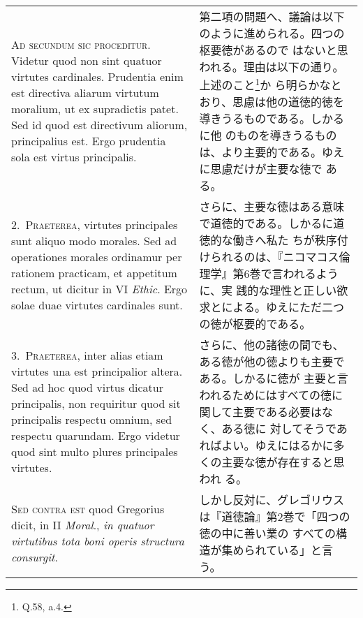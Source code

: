 \documentclass[10pt]{jsarticle}
\begin{document}
\begin{longtable}{p{21em}p{21em}}
{\scshape Ad secundum sic proceditur}. Videtur quod non sint quatuor
virtutes cardinales. Prudentia enim est directiva aliarum virtutum
moralium, ut ex supradictis patet. Sed id quod est directivum aliorum,
principalius est. Ergo prudentia sola est virtus principalis.

&

 第二項の問題へ、議論は以下のように進められる。四つの枢要徳があるので
 はないと思われる。理由は以下の通り。上述のこと\footnote{Q.58, a.4.}か
 ら明らかなとおり、思慮は他の道徳的徳を導きうるものである。しかるに他
 のものを導きうるものは、より主要的である。ゆえに思慮だけが主要な徳で
 ある。

\\



2.~{\scshape Praeterea}, virtutes principales sunt aliquo modo
morales. Sed ad operationes morales ordinamur per rationem practicam,
et appetitum rectum, ut dicitur in VI {\itshape Ethic}. Ergo solae
duae virtutes cardinales sunt.


&

 さらに、主要な徳はある意味で道徳的である。しかるに道徳的な働きへ私た
 ちが秩序付けられるのは、『ニコマコス倫理学』第6巻で言われるように、実
 践的な理性と正しい欲求とによる。ゆえにただ二つの徳が枢要的である。


\\



3.~{\scshape Praeterea}, inter alias etiam virtutes una est
principalior altera. Sed ad hoc quod virtus dicatur principalis, non
requiritur quod sit principalis respectu omnium, sed respectu
quarundam. Ergo videtur quod sint multo plures principales virtutes.


&

さらに、他の諸徳の間でも、ある徳が他の徳よりも主要である。しかるに徳が
主要と言われるためにはすべての徳に関して主要である必要はなく、ある徳に
対してそうであればよい。ゆえにはるかに多くの主要な徳が存在すると思われ
る。

\\




{\scshape Sed contra est} quod Gregorius dicit, in II {\itshape
Moral}., {\itshape in quatuor virtutibus tota boni operis structura
consurgit}.

&

 しかし反対に、グレゴリウスは『道徳論』第2巻で「四つの徳の中に善い業の
 すべての構造が集められている」と言う。



\end{longtable}
\end{document}
